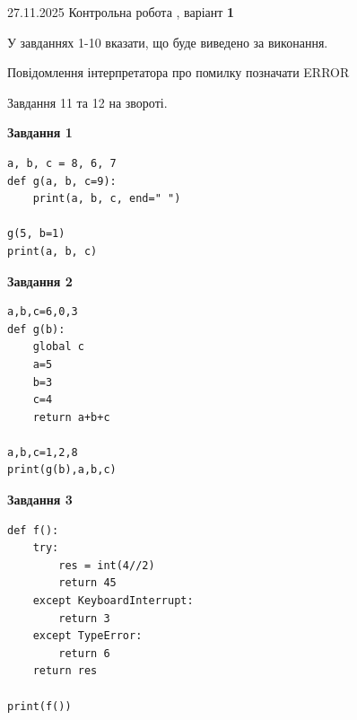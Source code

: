 \documentclass[12pt, ukrainian]{article}
\begin{document}
{{ 27.11.2025 Контрольна робота , варіант  \No \textbf { 1 }\par}}
{

{%



У завданнях 1-10 вказати, що буде виведено за виконання.

Повідомлення інтерпретатора про помилку позначати ERROR

Завдання 11 та 12 на звороті.

\begin{minipage}[t]{7.5cm}

\begin{center}
\textbf{Завдання 1}
\end{center}

\begin{verbatim}
a, b, c = 8, 6, 7
def g(a, b, c=9):
    print(a, b, c, end=" ")

g(5, b=1)
print(a, b, c)
\end{verbatim}



\begin{center}
\textbf{Завдання 2}
\end{center}

\begin{verbatim}
a,b,c=6,0,3
def g(b):
    global c
    a=5
    b=3
    c=4
    return a+b+c

a,b,c=1,2,8
print(g(b),a,b,c)
\end{verbatim}



\begin{center}
\textbf{Завдання 3}
\end{center}

\begin{verbatim}
def f():
    try:
        res = int(4//2)
        return 45
    except KeyboardInterrupt: 
        return 3
    except TypeError: 
        return 6
    return res

print(f())
\end{verbatim}




\end{minipage}}}
\end{document}
